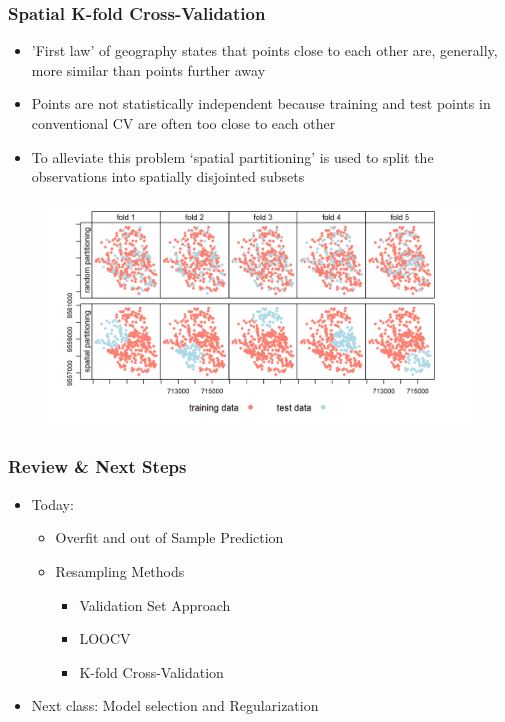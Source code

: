 \documentclass[
  shownotes,
  xcolor={svgnames},
  hyperref={colorlinks,citecolor=DarkBlue,linkcolor=DarkRed,urlcolor=DarkBlue}
  , aspectratio=169]{beamer}
\begin{document}
\begin{frame}[fragile]
\frametitle{Spatial K-fold Cross-Validation }

\begin{itemize}
  \scriptsize
  \item 'First law' of geography states that points close to each other are, generally, more similar than points further away
  \item Points are not statistically independent because training and test points in conventional CV are often too close to each other 
  \item To alleviate this problem `spatial partitioning' is used to split the observations into spatially disjointed subsets 
\end{itemize}

 \begin{figure}[H] \centering
            \captionsetup{justification=centering}
              \includegraphics[scale=0.3]{figures/fig113.png}
       \end{figure}

\end{frame}

\begin{frame}
\frametitle{Review \& Next Steps}
  
\begin{itemize} 
    \item Today:
    \medskip
    \begin{itemize} 
         \item Overfit and out of Sample Prediction
         \medskip
         \item Resampling Methods 
        \begin{itemize}  
            \item Validation Set Approach 
            \medskip
            \item LOOCV
            \medskip
            \item K-fold Cross-Validation
      \end{itemize}
    \end{itemize}
  	\bigskip  

	\item  Next class: Model selection and Regularization




\end{itemize}
\end{frame}
\end{document}
